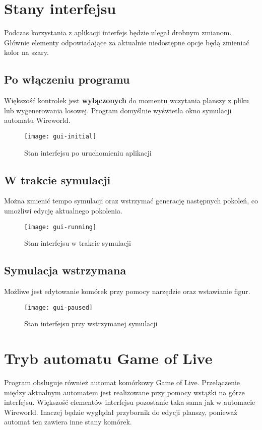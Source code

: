\documentclass{report}
\begin{document}
\section{Stany interfejsu}
Podczas korzystania z aplikacji interfejs będzie ulegał drobnym zmianom. Głównie elementy odpowiadające za aktualnie niedostępne opcje będą zmieniać kolor na szary.

\subsection{Po włączeniu programu}
Większość kontrolek jest \textbf{wyłączonych} do momentu wczytania planszy z pliku lub wygenerowania losowej. Program domyślnie wyświetla okno symulacji automatu Wireworld.

\begin{figure}[H]
    \centering
    \texttt{[image: gui-initial]}
    \caption{Stan interfejsu po uruchomieniu aplikacji}
\end{figure}

\subsection{W trakcie symulacji}
Można zmienić tempo symulacji oraz wstrzymać generację następnych pokoleń, co umożliwi edycję aktualnego pokolenia.

\begin{figure}[H]
    \centering
    \texttt{[image: gui-running]}
    \caption{Stan interfejsu w trakcie symulacji}
\end{figure}

\subsection{Symulacja wstrzymana}
Możliwe jest edytowanie komórek przy pomocy narzędzie oraz wstawianie figur.

\begin{figure}[H]
    \centering
    \texttt{[image: gui-paused]}
    \caption{Stan interfejsu przy wstrzymanej symulacji}
\end{figure}

\section{Tryb automatu Game of Live}
Program obsługuje również automat komórkowy Game of Live. Przełączenie między aktualnym automatem jest realizowane przy pomocy wstążki na górze interfejsu.
Większość elementów interfejsu pozostanie taka sama jak w automacie Wireworld. Inaczej będzie wyglądał przybornik do edycji planszy, ponieważ automat ten zawiera inne stany komórek.
\end{document}

